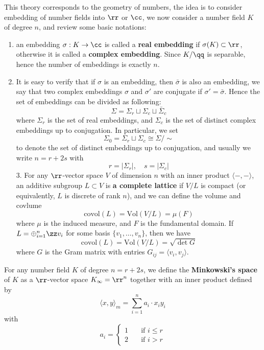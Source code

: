 This theory corresponds to the geometry of numbers, the idea is to consider embedding of number fields into \(\rr\) or \(\cc\), we now consider a number field \(K\) of degree \(n\), and review some basic notations:
    \begin{enumerate}
        \item an embedding \(\sigma: K \to \cc\) is called a \textbf{real embedding} if \(\sigma(K) \subset \rr\), otherwise it is called a \textbf{complex embedding}. Since \(K/\qq\) is separable, hence the number of embeddings is exactly \(n\).
        \item It is easy to verify that if \(\sigma\) is an embedding, then \(\bar{\sigma}\) is also an embedding, we say that two complex embeddings \(\sigma\) and \(\sigma'\) are conjugate if
        \(\sigma' = \bar{\sigma}\). Hence the set of embeddings can be divided as following:
        \[\Sigma = \Sigma_r \sqcup \Sigma_c \sqcup \bar{\Sigma}_c\]
        where \(\Sigma_r\) is the set of real embeddings, and \(\Sigma_c\) is the set of distinct complex embeddings up to conjugation. In particular, we set 
        \[\Sigma_0 = \Sigma_r \sqcup \Sigma_c \cong \Sigma / \sim\]
        to denote the set of distinct embeddings up to conjugation, and usually we write \(n = r+2s\) with
        \[r=|\Sigma_r|, \quad s = |\Sigma_c|\]
        3. For any \(\rr\)-vector space \(V\) of dimension \(n\) with an inner product \(\langle -,- \rangle\), an additive subgroup \(L \subset V\) is \textbf{a complete lattice} if \(V/L\) is compact (or equivalently, \(L\) is discrete of rank \(n\)), and we can define the volume and covlume
        \[\mathrm{covol}(L) = \mathrm{Vol}(V/L) = \mu(F)\]
        where \(\mu\) is the induced measure, and \(F\) is the fundamental domain. If \(L = \oplus_{i=1}^n \zz v_i\) for some basis \(\{v_1, \ldots, v_n\}\), then we have 
        \[\mathrm{covol}(L) =\mathrm{Vol}(V/L) = \sqrt{\det G}\]
        where \(G\) is the Gram matrix with entries \(G_{ij} = \langle v_i, v_j \rangle\).
    \end{enumerate}

    \begin{definition}
        For any number field \(K\) of degree \(n=r+2s\), we define the \textbf{Minkowski's space} of \(K\) as a \(\rr\)-vector space \(K_{\infty} = \rr^n\) together with an inner product defined by
        \[\langle x,y \rangle_m = \sum_{i=1}^n a_i \cdot x_iy_i\]
        with \[a_i = \begin{cases}
            1 \quad &\text{if } i \leq r\\
            2 \quad &\text{if } i > r
        \end{cases}\]
    \end{definition}

